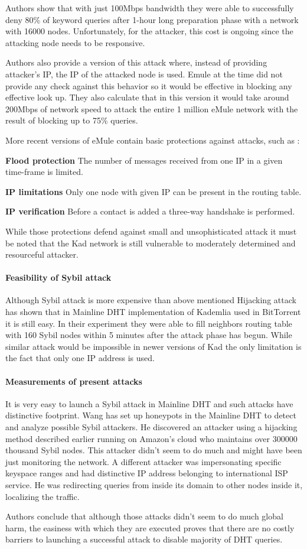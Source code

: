 Authors show that with just 100Mbps bandwidth they were able to successfully
deny 80\% of keyword queries after 1-hour long preparation phase with a
network with 16000 nodes. Unfortunately, for the attacker, this cost is ongoing
since the attacking node needs to be responsive.

Authors also provide a version of this attack where, instead of providing
attacker's IP, the IP of the attacked node is used. Emule at the time did not
provide any check against this behavior so it would be effective in blocking
any effective look up. They also calculate that in this version it would take
around 200Mbps of network speed to attack the entire 1 million eMule network
with the result of blocking up to 75\% queries.

More recent versions of eMule contain basic protections against attacks, such
as \cite{tim11}:
\begin{description}
  \item{\textbf{Flood protection}} The number of messages received from one IP
    in a given time-frame is limited.
  \item{\textbf{IP limitations}} Only one node with given IP can be present in
    the routing table.
  \item{\textbf{IP verification}} Before a contact is added a three-way
    handshake is performed.
\end{description}

While those protections defend against small and unsophisticated attack it must
be noted that the Kad network is still vulnerable to moderately determined and
resourceful attacker.

\paragraph{Feasibility of Sybil attack}
Although Sybil attack is more expensive than above mentioned Hijacking attack
\cite{tim11} has shown that in Mainline DHT implementation of Kademlia used in
BitTorrent it is still easy. In their experiment they were able to fill
neighbors routing table with 160 Sybil nodes within 5 minutes after the attack
phase has begun. While similar attack would be impossible in newer versions of
Kad the only limitation is the fact that only one IP address is used.

\paragraph{Measurements of present attacks}
It is very easy to launch a Sybil attack in Mainline DHT and such attacks have
distinctive footprint. Wang \cite{wan12} has set up honeypots in the Mainline
DHT to detect and analyze possible Sybil attackers. He discovered an attacker
using a hijacking method described earlier running on Amazon's cloud who
maintains over 300000 thousand Sybil nodes. This attacker didn't seem to do much
and might have been just monitoring the network. A different attacker was
impersonating specific keyspace ranges and had distinctive IP address belonging
to international ISP service. He was redirecting queries from inside its domain
to other nodes inside it, localizing the traffic.

Authors conclude that although those attacks didn't seem to do much global harm,
the easiness with which they are executed proves that there are no costly
barriers to launching a successful attack to disable majority of DHT queries.
